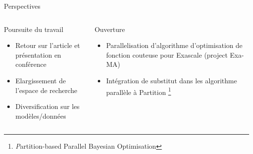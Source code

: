
\begin{frame}{Perspectives}
    \begin{columns}
        
        \begin{column}[t]{0.45\textwidth} 
            \begin{block}{Poursuite du travail}
                \begin{itemize}
                    \item Retour sur l'article et présentation en conférence
                    \item Elargissement de l'espace de recherche
                    \item Diversification sur les modèles/données
                \end{itemize}                
            \end{block}

        \end{column}  
            \begin{column}[t]{0.45\textwidth}
                \begin{block}{Ouverture}
                    \begin{itemize}
                        \item Parallelisation d'algorithme d'optimisation de fonction couteuse pour Exascale (project Exa-MA)
                        \item Intégration de substitut dans les algorithme parallèle à Partition \footnote{\textit Partition-based Parallel Bayesian Optimisation}
                    \end{itemize}                
                \end{block}
            \end{column}
        
                 
    \end{columns}
    
\end{frame}